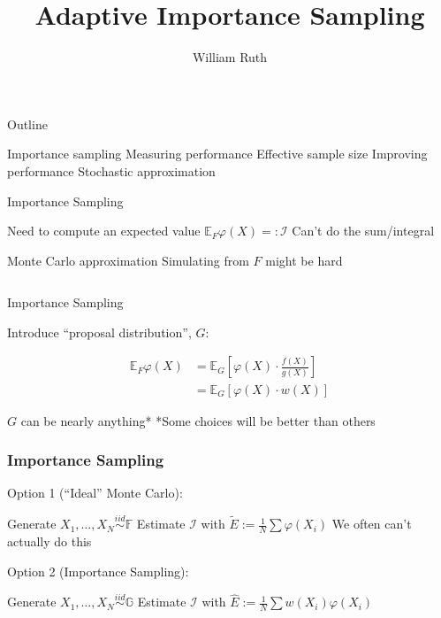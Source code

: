 \documentclass[14pt]{beamer}
\title[]{Adaptive Importance Sampling}
\author{William Ruth}
\institute[]{Mount Royal University}
\date{\vspace{-3cm}}
\newcommand{\bE}{\mathbb{E}}
\newcommand{\bF}{\mathbb{F}}
\newcommand{\bG}{\mathbb{G}}
\newcommand{\I}{\mathcal{I}}
\begin{document}
\begin{frame}
    \titlepage
\end{frame}


\begin{frame}{Outline}
    \begin{outline}
        \1 Importance sampling \newline
        \1 Measuring performance
            \2 Effective sample size \newline
        \1 Improving performance
            \2 Stochastic approximation

    \end{outline}
\end{frame}


\begin{frame}{Importance Sampling}
    \begin{outline}
        \1 Need to compute an expected value
            \2 $\bE_F \varphi(X) =: \mathcal{I}$
        \1 Can't do the sum/integral \newline

        \1 Monte Carlo approximation
            \2 Simulating from $F$ might be hard
    \end{outline}
    \begin{equation*}
    \end{equation*}
\end{frame}

\begin{frame}{Importance Sampling}
    \begin{outline}
        \1 Introduce ``proposal distribution'', $G$:
    \end{outline}
    \begin{align*}
        \bE_F \varphi(X) &=  \bE_G \left[ \varphi(X) \cdot \frac{f(X)}{g(X)} \right] \\
        &=  \bE_G \left[ \varphi(X) \cdot w(X) \right]
    \end{align*}
    \begin{outline}
        \1 $G$ can be nearly anything*
            \2 *Some choices will be better than others
    \end{outline}
\end{frame}

\begin{frame}
    \frametitle{Importance Sampling}
    Option 1 (``Ideal'' Monte Carlo):
    \begin{outline}
        \1 Generate $X_1,\ldots, X_N \overset{iid}{\sim} \bF$
        \1 Estimate $\I$ with $\tilde{E} := \frac{1}{N} \sum \varphi (X_i)$
            \2 We often can't actually do this \newline
    \end{outline}
    Option 2 (Importance Sampling): 
    \begin{outline}
        \1 Generate $X_1, \ldots, X_N \overset{iid}{\sim} \bG$
        \1 Estimate $\I$ with $\hat{E} := \frac{1}{N} \sum w(X_i) \varphi (X_i)$
    \end{outline}
\end{frame}
\end{document}
